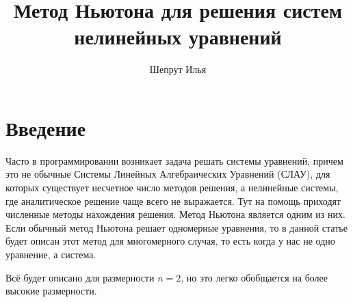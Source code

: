 \documentclass[12pt, a4paper]{article}
\begin{document}
\title{Метод Ньютона для решения систем нелинейных уравнений}
\author{Шепрут Илья}
\maketitle

\tableofcontents

\newpage

\section{Введение}

Часто в программировании возникает задача решать системы уравнений, причем это не обычные Системы Линейных Алгебраических Уравнений (СЛАУ), для которых существует несчетное число методов решения, а нелинейные системы, где аналитическое решение чаще всего не выражается. Тут на помощь приходят численные методы нахождения решения. Метод Ньютона является одним из них. Если обычный метод Ньютона решает одномерные уравнения, то в данной статье будет описан этот метод для многомерного случая, то есть когда у нас не одно уравнение, а система.

Всё будет описано для размерности $n = 2$, но это легко обобщается на более высокие размерности.
\end{document}
